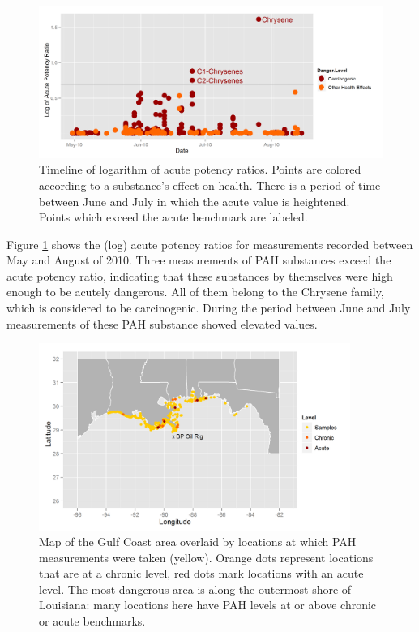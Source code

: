 \documentclass[authoryear,12pt]{elsarticle}
\begin{document}
\begin{figure}[htbp] %
   \centering
   \includegraphics[width=5in]{acute-timeline.png} 
   \caption{Timeline of logarithm of acute potency ratios.  Points are colored according to a substance's effect on health. There is a period of time between June and July in which the acute value is heightened.  Points which exceed the acute benchmark are labeled.}
   \label{pah-timeline}
\end{figure}


Figure \ref{pah-timeline} shows the (log) acute potency ratios for measurements recorded between May and August of 2010. Three measurements of PAH substances exceed the acute potency ratio, indicating that these substances by themselves were high enough to be acutely dangerous. All of them belong to the Chrysene family, which  is considered to be carcinogenic. During the  period between June and July  measurements of these PAH substance showed elevated values.

\begin{figure}[htbp] %
   \centering
   \includegraphics[width=4in]{chron-acute-map.png} 
   \caption{Map of the Gulf Coast area overlaid by locations at which PAH measurements were taken (yellow). Orange dots represent locations that are at a chronic level, red dots mark locations with an acute level.  The most dangerous area is along the outermost shore of Louisiana: many locations here have PAH levels at or above chronic or acute benchmarks.}
   \label{pah-map}
\end{figure}
\end{document}
